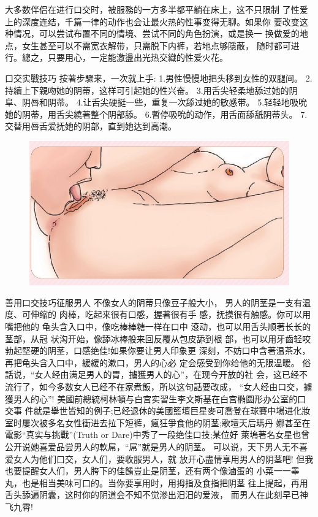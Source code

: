 \documentclass[12pt,UTF8]{ctexbook}
\begin{document}
大多数伴侣在进行口交时，被服務的一方多半都平躺在床上，这不只限制
了性爱上的深度连结，千篇一律的动作也会让最火热的性事变得无聊。如果你
要改变这种情况，可以尝试布置不同的情境、尝试不同的角色扮演，或是换一
换做爱的地点，女生甚至可以不需宽衣解带，只需脱下内裤，若地点够隱蔽，
随时都可进行。總之，只要用心，一定能激盪出光热交織的性爱火花。

口交实戰技巧
按著步驟来，一次就上手:
1.男性慢慢地把头移到女性的双腿间。
2.持續上下親吻她的阴蒂，这样可引起她的性兴奋。
3.用舌尖轻柔地舔过她的阴阜、阴唇和阴蒂。
4.让舌尖硬挺一些，重复一次舔过她的敏感带。
5.轻轻地吸吮她的阴蒂，用舌尖繞著整个阴部舔。
6.暫停吸吮的动作，用舌面舔舐阴蒂头。
7.交替用唇舌爱抚她的阴部，直到她达到高潮。

\begin{figure}[htbp]
	\centering
	\includegraphics[width=0.7\linewidth]{19}
	\caption{}
	\label{fig:1}
\end{figure}

善用口交技巧征服男人
不像女人的阴蒂只像豆子般大小，
男人的阴茎是一支有温度、可伸缩的
肉棒，吃起来很有口感，握著很有手
感，抚摸很有触感。你可以用嘴把他的
龟头含入口中，像吃棒棒糖一样在口中
滾动，也可以用舌头顺著长长的茎部，从冠
状沟开始，像舔冰棒般来回反覆从包皮舔到根
部，也可以用牙齒轻咬勃起堅硬的阴茎，口感绝佳!如果你要让男人印象更
深刻，不妨口中含著温茶水，再把龟头含入口中，緩緩的漱口，男人的心必
定会感受到你给他的无限温暖。
俗話说，“女人经由满足男人的胃，擄獲男人的心”，在现今开放的社
会，这已经不流行了，如今多数女人已经不在家煮飯，所以这句話要改成，
“女人经由口交，擄獲男人的心”!
美國前總統柯林頓与白宫实習生李文斯基在白宫椭圆形办公室的口交事
件就是舉世皆知的例子;已经退休的美國籃壇巨星麥可喬登在球賽中場进化妝室时屢次被多名女性衝进去拉下短裤，瘋狂爭食他的阴茎;歌壇天后瑪丹
娜甚至在電影“真实与挑戰”(Truth or Dare)中秀了一段绝佳口技;某位好
萊塢著名女星也曾公开说她喜爱品尝男人的軟屌，“屌”就是男人的阴茎。
可以说，天下男人无不喜爱女人为他们口交，女人们，要收服男人，就
放开心盡情享用男人的阴茎吧!
但我也要提醒女人们，男人胯下的佳餚豈止是阴茎，还有两个像滷蛋的
小菜一一睾丸，也是相当美味可口的。当你要享用时，用拇指及食指把阴茎
往上提起，再用舌头舔遍阴囊，这时你的阴道会不知不觉滲出汨汨的爱液，
而男人在此刻早已神飞九霄!
\end{document}
